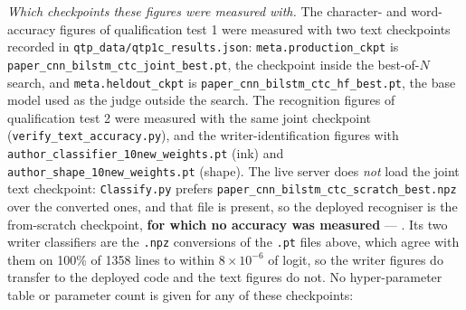 \emph{Which checkpoints these figures were measured with.}
The character- and word-accuracy figures of qualification test 1 were measured with two text checkpoints recorded in \texttt{qtp\_data/qtp1c\_results.json}: \texttt{meta.production\_ckpt} is \texttt{paper\_cnn\_bilstm\_ctc\_joint\_best.pt}, the checkpoint inside the best-of-$N$ search, and \texttt{meta.heldout\_ckpt} is \texttt{paper\_cnn\_bilstm\_ctc\_hf\_best.pt}, the base model used as the judge outside the search.
The recognition figures of qualification test 2 were measured with the same joint checkpoint (\texttt{verify\_text\_accuracy.py}), and the writer-identification figures with \texttt{author\_classifier\_10new\_weights.pt} (ink) and \texttt{author\_shape\_10new\_weights.pt} (shape).
The live server does \emph{not} load the joint text checkpoint: \texttt{Classify.py} prefers \texttt{paper\_cnn\_bilstm\_ctc\_scratch\_best.npz} over the converted ones, and that file is present, so the deployed recogniser is the from-scratch checkpoint, \textbf{for which no accuracy was measured} --- \nym{}.
Its two writer classifiers are the \texttt{.npz} conversions of the \texttt{.pt} files above, which agree with them on 100\% of 1358 lines to within $8\times10^{-6}$ of logit, so the writer figures do transfer to the deployed code and the text figures do not.
No hyper-parameter table or parameter count is given for any of these checkpoints: 

